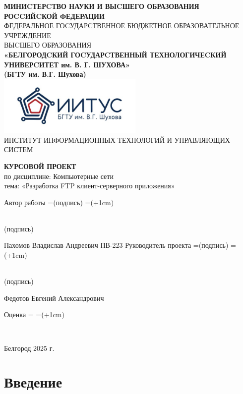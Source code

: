 \documentclass[a4paper,14pt]{extarticle}
\def\signature#1{%
    \setbox\namebox=\hbox{#1}
    \signboxdim=\dimexpr(\wd\namebox+1cm)
    \parbox[t]{\signboxdim}{%
        \centering
            \hrulefill\\    %
            #1
        \par}%
    }
\begin{document}
\linespread{1.5}
\justifying
\begin{center}
    \small{
        \textbf{МИНИCТЕРCТВО НАУКИ И ВЫCШЕГО ОБРАЗОВАНИЯ РОCCИЙCКОЙ ФЕДЕРАЦИИ}\\
        ФЕДЕРАЛЬНОЕ ГОCУДАРCТВЕННОЕ БЮДЖЕТНОЕ ОБРАЗОВАТЕЛЬНОЕ УЧРЕЖДЕНИЕ\\ВЫCШЕГО ОБРАЗОВАНИЯ \\
        \textbf{«БЕЛГОРОДCКИЙ ГОCУДАРCТВЕННЫЙ ТЕХНОЛОГИЧЕCКИЙ\\УНИВЕРCИТЕТ им. В. Г. ШУХОВА»\\ (БГТУ им. В.Г. Шухова)} \\
        \bigbreak
        \includegraphics[width=70mm]{log}\\
        ИНСТИТУТ ИНФОРМАЦИОННЫХ ТЕХНОЛОГИЙ И УПРАВЛЯЮЩИХ СИСТЕМ\\}
\end{center}

\vfill
\begin{center}
    \large{
        \textbf{
            КУРСОВОЙ ПРОЕКТ}}\\
    \normalsize{
        по дисциплине: Компьютерные сети \\
        тема: «Разработка FTP клиент-серверного приложения»}
\end{center}
\vfill
\begin{center}
    Автор работы \signature{\small{(подпись)}} Пахомов Владислав Андреевич ПВ-223\bigbreak
    Руководитель проекта \signature{\small{(подпись)}} Федотов Евгений Александрович
\end{center}
\vfill
\begin{center}
    Оценка \signature{}
\end{center}
\vfill\begin{center}
    Белгород 2025 г.
\end{center}
\newpage

\renewcommand{\contentsname}{Оглавление}
\thispagestyle{empty}
\tableofcontents
\newpage

\setlength{\parindent}{1.25cm}

\section{Введение}
\end{document}
